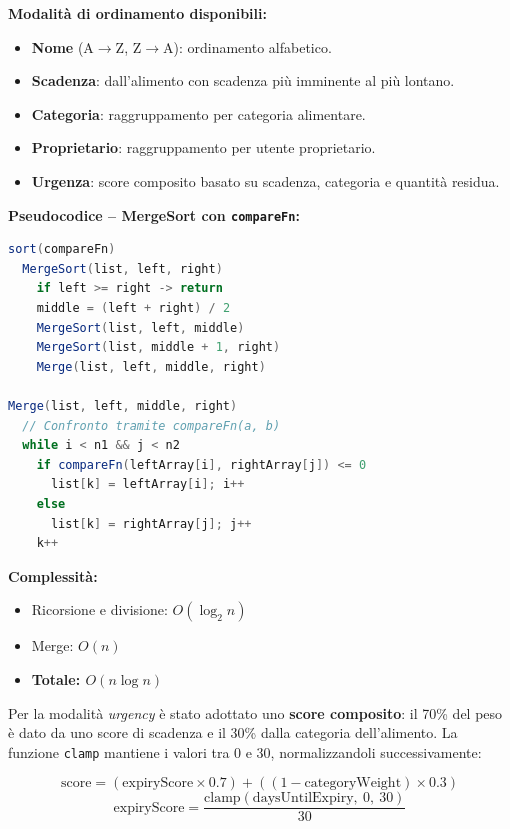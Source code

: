 \documentclass[12pt,a4paper,twoside]{report}
\begin{document}
\textbf{Modalità di ordinamento disponibili:}
\begin{itemize}
  \item \textbf{Nome} (A$\rightarrow$Z, Z$\rightarrow$A): ordinamento alfabetico.
  \item \textbf{Scadenza}: dall'alimento con scadenza più imminente al più lontano.
  \item \textbf{Categoria}: raggruppamento per categoria alimentare.
  \item \textbf{Proprietario}: raggruppamento per utente proprietario.
  \item \textbf{Urgenza}: score composito basato su scadenza, categoria e quantità residua.
\end{itemize}

\textbf{Pseudocodice -- MergeSort con \texttt{compareFn}:}

\begin{lstlisting}[language=java, caption={Algoritmo di Sorting -- MergeSort}]
sort(compareFn)
  MergeSort(list, left, right)
    if left >= right -> return
    middle = (left + right) / 2
    MergeSort(list, left, middle)
    MergeSort(list, middle + 1, right)
    Merge(list, left, middle, right)

Merge(list, left, middle, right)
  // Confronto tramite compareFn(a, b)
  while i < n1 && j < n2
    if compareFn(leftArray[i], rightArray[j]) <= 0
      list[k] = leftArray[i]; i++
    else
      list[k] = rightArray[j]; j++
    k++
\end{lstlisting}

\textbf{Complessità:}
\begin{itemize}
  \item Ricorsione e divisione: $O(\log_2 n)$
  \item Merge: $O(n)$
  \item \textbf{Totale: $O(n \log n)$}
\end{itemize}

Per la modalità \textit{urgency} è stato adottato uno \textbf{score composito}: il 70\% del peso è dato da uno score di scadenza e il 30\% dalla categoria dell'alimento. La funzione \texttt{clamp} mantiene i valori tra 0 e 30, normalizzandoli successivamente:

\begin{equation}
  \text{score} = (\text{expiryScore} \times 0.7) + ((1 - \text{categoryWeight}) \times 0.3)
\end{equation}
\begin{equation}
  \text{expiryScore} = \frac{\text{clamp}(\text{daysUntilExpiry},\ 0,\ 30)}{30}
\end{equation}
\end{document}

